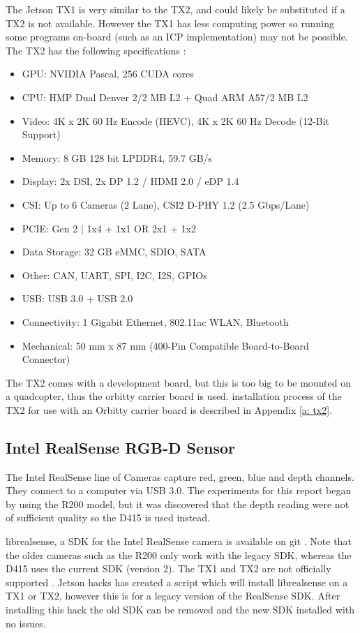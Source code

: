 \documentclass[12pt,a4paper]{article}
\begin{document}
    The Jetson TX1 is very similar to the TX2, and could likely be substituted if a TX2 is not available. However the TX1 has less computing power so running some programs on-board (such as an ICP implementation) may not be possible. 
    The TX2 has the following specifications \cite{tx2-specs}:
    \begin{itemize}
    \item GPU: NVIDIA Pascal, 256 CUDA cores
    \item CPU: HMP Dual Denver 2/2 MB L2 + Quad ARM A57/2 MB L2
    \item Video: 4K x 2K 60 Hz Encode (HEVC), 4K x 2K 60 Hz Decode (12-Bit Support)
    \item Memory: 8 GB 128 bit LPDDR4, 59.7 GB/s
    \item Display: 2x DSI, 2x DP 1.2 / HDMI 2.0 / eDP 1.4
    \item CSI: Up to 6 Cameras (2 Lane), CSI2 D-PHY 1.2 (2.5 Gbps/Lane)
    \item PCIE: Gen 2 | 1x4 + 1x1 OR 2x1 + 1x2
    \item Data Storage: 32 GB eMMC, SDIO, SATA
    \item Other: CAN, UART, SPI, I2C, I2S, GPIOs
    \item USB: USB 3.0 + USB 2.0
    \item Connectivity: 1 Gigabit Ethernet, 802.11ac WLAN, Bluetooth
    \item Mechanical: 50 mm x 87 mm (400-Pin Compatible Board-to-Board Connector)
    \end{itemize}
    The TX2 comes with a development board, but this is too big to be mounted on a quadcopter, thus the orbitty carrier board is used. installation process of the TX2 for use with an Orbitty carrier board is described in Appendix \ref{a: tx2}.

  \subsection{Intel RealSense RGB-D Sensor}
    \label{ssec: BI realsense}
    The Intel RealSense line of Cameras capture red, green, blue and depth channels. They connect to a computer via USB 3.0. The experiments for this report began by using the R200 model, but it was discovered that the depth reading were not of sufficient quality so the D415 is used instead.
     
    librealsense, a SDK for the Intel RealSense camera is available on git \cite{librealsense}. Note that the older cameras such as the R200 only work with the legacy SDK, whereas the D415 uses the current SDK (version 2). The TX1 and TX2 are not officially supported \cite{librealsense-jetson}. Jetson hacks \cite{jetsonhacks-librealsense} has created a script which will install librealsense on a TX1 or TX2, however this is for a legacy version of the RealSense SDK. After installing this hack the old SDK can be removed and the new SDK installed with no issues. 
     
\end{document}
